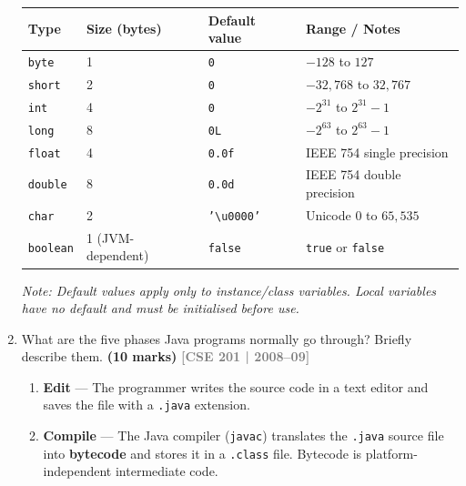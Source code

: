 \documentclass[12pt,a3paper]{article}
\newcommand{\yr}[1]{\hfill\textcolor{gray}{\small\textbf{[#1]}}}
\newcommand{\mk}[1]{\textcolor{orange!70!black}{\small\textbf{(#1 marks)}}}
\begin{document}
\begin{enumerate}
\begin{tcolorbox}[enhanced,breakable,ansbox,
  colback=cB!4,colframe=cB,boxrule=0.8pt,arc=5pt,
  title={\textbf{Answer --- Java Primitive Data Types}},
  fonttitle=\bfseries\color{white},colbacktitle=cB]
\begin{center}
\small
\begin{tabular}{@{}llll@{}}
\toprule
\textbf{Type} & \textbf{Size (bytes)} & \textbf{Default value}
  & \textbf{Range / Notes} \\
\midrule
\texttt{byte}    & 1 & \texttt{0}           & $-128$ to $127$ \\
\texttt{short}   & 2 & \texttt{0}           & $-32{,}768$ to $32{,}767$ \\
\texttt{int}     & 4 & \texttt{0}           & $-2^{31}$ to $2^{31}-1$ \\
\texttt{long}    & 8 & \texttt{0L}          & $-2^{63}$ to $2^{63}-1$ \\
\texttt{float}   & 4 & \texttt{0.0f}        & IEEE 754 single precision \\
\texttt{double}  & 8 & \texttt{0.0d}        & IEEE 754 double precision \\
\texttt{char}    & 2 & \texttt{'\textbackslash u0000'} & Unicode $0$ to $65{,}535$ \\
\texttt{boolean} & 1 (JVM-dependent) & \texttt{false} & \texttt{true} or \texttt{false} \\
\bottomrule
\end{tabular}
\end{center}

\textit{Note: Default values apply only to instance/class variables.
Local variables have no default and must be initialised before use.}

\end{tcolorbox}

\item What are the five phases Java programs normally go through? Briefly describe them. \mk{10}
\yr{CSE 201 | 2008--09}

\begin{tcolorbox}[enhanced,breakable,ansbox,
  colback=cB!4,colframe=cB,boxrule=0.8pt,arc=5pt,
  title={\textbf{Answer --- Five Phases of a Java Program}},
  fonttitle=\bfseries\color{white},colbacktitle=cB]

\begin{enumerate}[label=\textbf{\arabic*.}]
  \item \textbf{Edit} --- The programmer writes the source code in a
    text editor and saves the file with a \texttt{.java} extension.

  \item \textbf{Compile} --- The Java compiler (\texttt{javac})
    translates the \texttt{.java} source file into
    \textbf{bytecode} and stores it in a \texttt{.class} file.
    Bytecode is platform-independent intermediate code.


\end{enumerate}
\end{tcolorbox}
\end{enumerate}
\end{document}

